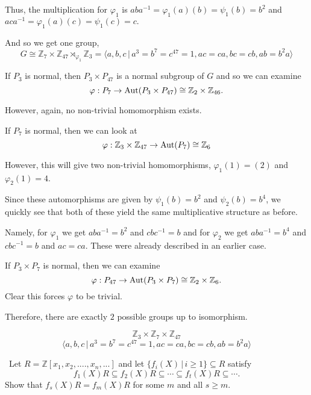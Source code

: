 \documentclass[12pt]{Qual}
\begin{document}
\begin{solution}
Thus, the multiplication for $\varphi_1$ is $a ba^{-1}=\varphi_1(a)(b)=\psi_1(b)=b^2$ and $aca^{-1}=\varphi_1(a)(c)=\psi_1(c)=c.$

And so we get one group, $$G\cong\mathbb{Z}_7\times\mathbb{Z}_{47}\rtimes_{\varphi_1}\mathbb{Z}_3=\langle a,b,c\,|\,a^3=b^7=c^{47}=1,ac=ca,bc=cb,ab=b^2a\rangle$$

 If $P_3$ is normal, then $P_3\times P_{47}$ is a normal subgroup of $G$ and so we can examine $$\varphi:P_7\to\text{Aut}(P_3\times P_{47})\cong\mathbb{Z}_2\times\mathbb{Z}_{46}.$$

However, again, no non-trivial homomorphism exists.

 If $P_7$ is normal, then we can look at $$\varphi:\mathbb{Z}_3\times\mathbb{Z}_{47}\to\text{Aut}(P_7)\cong\mathbb{Z}_6$$

However, this will give two non-trivial homomorphisms, $\varphi_1(1)=(2)$ and $\varphi_2(1)=4$.

Since these automorphisms are given by $\psi_1(b)=b^2$ and $\psi_2(b)=b^4$, we quickly see that both of these yield the same multiplicative structure as before.

Namely, for $\varphi_1$ we get $aba^{-1}=b^2$ and $cbc^{-1}=b$ and for $\varphi_2$ we get $aba^{-1}=b^4$ and $cbc^{-1}=b$ and $ac=ca$. These were already described in an earlier case.


 If $P_3\times P_7$ is normal, then we can examine $$\varphi:P_{47}\to\text{Aut}(P_3\times P_7)\cong\mathbb{Z}_2\times\mathbb{Z}_6.$$ Clear this forces $\varphi$ to be trivial.

Therefore, there are exactly $2$ possible groups up to isomorphism.

\begin{center}
    \begin{framed}
    \vspace{-0.25cm}
    $$\mathbb{Z}_3\times\mathbb{Z}_7\times\mathbb{Z}_{47}$$
    \vspace{-0.5cm}
    $$\langle a,b,c\,|\,a^3=b^7=c^{47}=1,ac=ca,bc=cb,ab=b^2a\rangle$$
    \end{framed}
\end{center}\qedhere
\end{solution}
\newpage



\begin{problem} $\,$
Let $R=\mathbb{Z}[x_1,x_2,....,x_n,...]$ and let $\{f_i(X)\,|\,i\ge 1\}\subseteq R$ satisfy $$f_1(X)R\subseteq f_2(X)R\subseteq\cdots\subseteq f_t(X)R\subseteq\cdots.$$ Show that $f_s(X)R=f_m(X)R$ for some $m$ and all $s\ge m.$
\end{problem}
\end{document}
